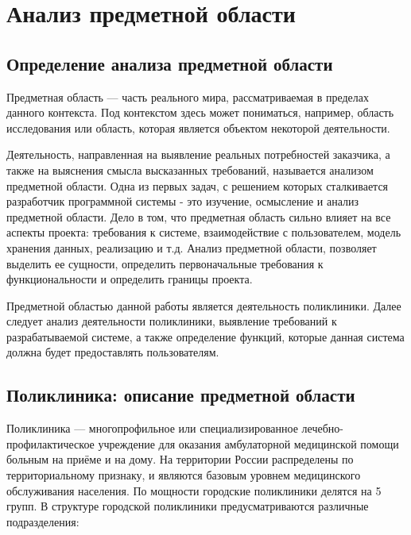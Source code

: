 \documentclass[14pt,a4paper,russian]{extreport}
\begin{document}
\addtocounter{page}{1}

\begingroup
\onehalfspace
\tableofcontents{}
\endgroup

\newpage

\sloppy

\chapter{Анализ предметной области}

\section{Определение анализа предметной области}
Предметная область — часть реального мира, рассматриваемая в пределах данного контекста. Под
контекстом здесь может пониматься, например, область исследования или область, которая является
объектом некоторой деятельности.\cite{domainknowladge}

Деятельность, направленная на выявление реальных потребностей заказчика, а также на выяснения
смысла высказанных требований, называется анализом предметной области.
Одна из первых задач, с решением которых сталкивается разработчик программной системы - это
изучение, осмысление и анализ предметной области. Дело в том, что предметная область сильно влияет
на все аспекты проекта: требования к системе, взаимодействие с пользователем, модель хранения
данных, реализацию и т.д.  Анализ предметной области, позволяет выделить ее сущности, определить
первоначальные требования к функциональности и определить границы проекта.

Предметной областью данной работы является деятельность поликлиники. Далее следует анализ деятельности
поликлиники, выявление требований к разрабатываемой системе, а также определение функций, которые
данная система должна будет предоставлять пользователям.


\section{Поликлиника: описание предметной области}
Поликлиника — многопрофильное или специализированное лечебно-профилактическое учреждение для
оказания амбулаторной медицинской помощи больным на приёме и на дому.  На территории России
распределены по территориальному признаку, и являются базовым уровнем медицинского обслуживания
населения.  По мощности городские поликлиники делятся на 5 групп. В структуре городской поликлиники
предусматриваются различные подразделения:
\end{document}
